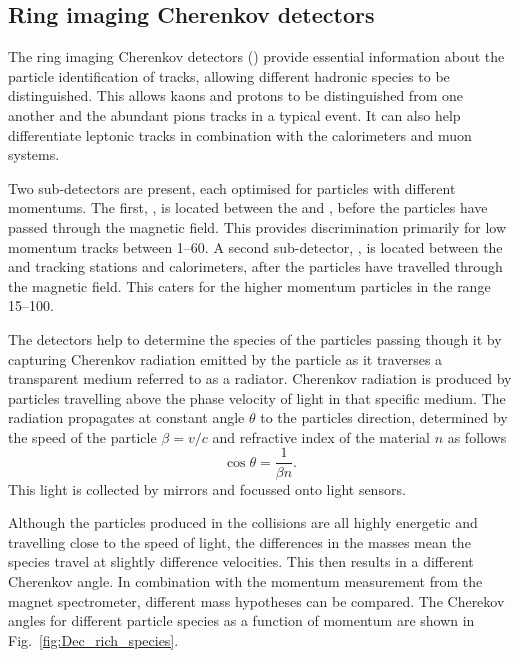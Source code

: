 \subsection{Ring imaging Cherenkov detectors}

The ring imaging Cherenkov detectors (\rich) provide essential information about the particle identification of tracks, allowing different hadronic species to be distinguished.
This allows kaons and protons to be distinguished from one another and the abundant pions tracks in a typical event. It can also help differentiate leptonic tracks in combination with the calorimeters and muon systems. 

Two \rich sub-detectors are present, each optimised for particles with different momentums. The first, \richone, is located between the \velo and \ttracker, before the particles have passed through the magnetic field. This provides discrimination primarily for low momentum tracks between 1--60\gevc. A second sub-detector, \richtwo, is located between the \intr and \ot tracking stations and calorimeters, after the particles have travelled through the magnetic field. This caters for the higher momentum particles in the range 15--100\gevc. 

The \rich detectors help to determine the species of the particles passing though it by capturing Cherenkov radiation emitted by the particle as it traverses a transparent medium referred to as a radiator. Cherenkov radiation is produced by particles travelling above the phase velocity of light in that specific medium. The radiation propagates at constant angle $\theta$ to the particles direction, determined by the speed of the particle $\beta = v/c$ and refractive index of the material $n$ as follows
\begin{equation}
\cos{\theta} = \frac{1}{\beta n}.
\end{equation}
This light is collected by mirrors and focussed onto light sensors. 

Although the particles produced in the collisions are all highly energetic and travelling close to the speed of light, the differences in the masses mean the species travel at slightly difference velocities. This then results in a different Cherenkov angle. In combination with the momentum measurement from the magnet spectrometer, different mass hypotheses can be compared. The Cherekov angles for different particle species as a function of momentum are shown in Fig.~\ref{fig:Dec_rich_species}. 


